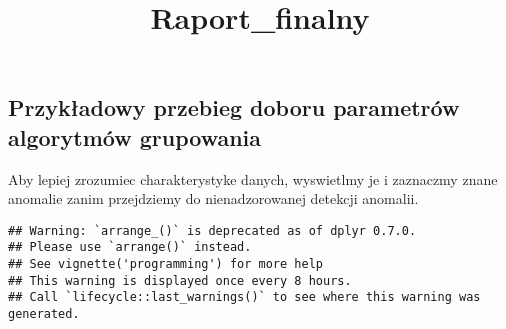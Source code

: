 \documentclass[
]{article}
\title{Raport\_finalny}
\author{}
\date{\vspace{-2.5em}}
\newenvironment{Shaded}{\begin{snugshade}}{\end{snugshade}}
\newcommand{\DataTypeTok}[1]{\textcolor[rgb]{0.13,0.29,0.53}{#1}}
\newcommand{\DecValTok}[1]{\textcolor[rgb]{0.00,0.00,0.81}{#1}}
\newcommand{\FloatTok}[1]{\textcolor[rgb]{0.00,0.00,0.81}{#1}}
\newcommand{\KeywordTok}[1]{\textcolor[rgb]{0.13,0.29,0.53}{\textbf{#1}}}
\newcommand{\NormalTok}[1]{#1}
\newcommand{\OperatorTok}[1]{\textcolor[rgb]{0.81,0.36,0.00}{\textbf{#1}}}
\newcommand{\OtherTok}[1]{\textcolor[rgb]{0.56,0.35,0.01}{#1}}
\newcommand{\StringTok}[1]{\textcolor[rgb]{0.31,0.60,0.02}{#1}}
\begin{document}
\maketitle

\hypertarget{przykux142adowy-przebieg-doboru-parametruxf3w-algorytmuxf3w-grupowania}{%
\subsection{Przykładowy przebieg doboru parametrów algorytmów
grupowania}\label{przykux142adowy-przebieg-doboru-parametruxf3w-algorytmuxf3w-grupowania}}

\begin{Shaded}
\end{Shaded}

Aby lepiej zrozumiec charakterystyke danych, wyswietlmy je i zaznaczmy
znane anomalie zanim przejdziemy do nienadzorowanej detekcji anomalii.

\begin{Shaded}
\end{Shaded}

\begin{verbatim}
## Warning: `arrange_()` is deprecated as of dplyr 0.7.0.
## Please use `arrange()` instead.
## See vignette('programming') for more help
## This warning is displayed once every 8 hours.
## Call `lifecycle::last_warnings()` to see where this warning was generated.
\end{verbatim}
\end{document}
